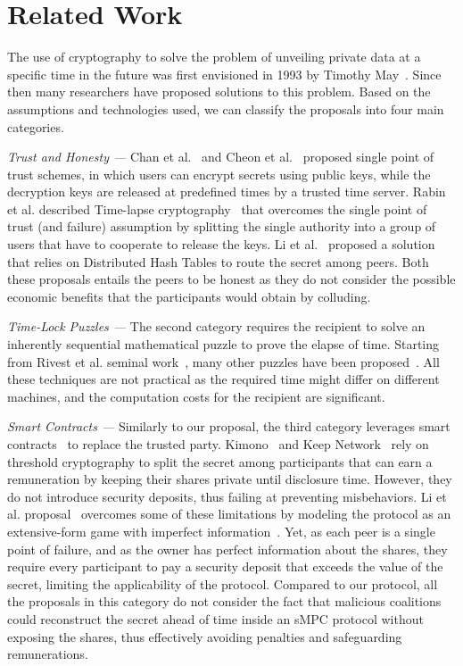\section{Related Work}\label{sect:relwork}

The use of cryptography to solve the problem of unveiling private data at a specific time in the future was first envisioned in 1993 by Timothy May~\cite{may1993timed}. Since then many researchers have proposed solutions to this problem.
%
Based on the assumptions and technologies used, we can classify the proposals into four main categories.

\smallskip
{\em Trust and Honesty ---} Chan et al.~\cite{1437112} and Cheon et al.~\cite{10.1007/11889663_17} proposed single point of trust schemes, in which users can encrypt secrets using public keys, while the decryption keys are released at predefined times by a trusted time server.
%
Rabin et al. described Time-lapse cryptography~\cite{rabin2006time,PARKES2008294} that overcomes the single point of trust (and failure) assumption by splitting the single authority into a group of users that have to cooperate to release the keys. Li et al.~\cite{dht} proposed a solution that relies on Distributed Hash Tables to route the secret among peers. Both these proposals entails the peers to be honest as they do not consider the possible economic benefits that the participants would obtain by colluding.

\smallskip
{\em Time-Lock Puzzles ---} The second category requires the recipient to solve an inherently sequential mathematical puzzle to prove the elapse of time. Starting from Rivest et al. seminal work~\cite{Rivest:1996:TPT:888615}, many other puzzles have been proposed~\cite{Bitansky:2016:TPR:2840728.2840745,cohen2018,mahmoody-tl}. All these techniques are not practical as the required time might differ on different machines, and the computation costs for the recipient are significant.

\smallskip
{\em Smart Contracts ---} Similarly to our proposal, the third category leverages smart contracts~\cite{szabo1997formalizing} to replace the trusted party. Kimono~\cite{kimono,kimono-network} and Keep Network~\cite{keep} rely on threshold cryptography to split the secret among participants that can earn a remuneration by keeping their shares private until disclosure time. However, they do not introduce security deposits, thus failing at preventing misbehaviors.
%
Li et al. proposal~\cite{self-emerging1} overcomes some of these limitations by modeling the protocol as an extensive-form game with imperfect information~\cite{leyton2008essentials}. Yet, as each peer is a single point of failure, and as the owner has perfect information about the shares, they require every participant to pay a security deposit that exceeds the value of the secret, limiting the applicability of the protocol.
%
Compared to our protocol, all the proposals in this category do not consider the fact that malicious coalitions could reconstruct the secret ahead of time inside an sMPC protocol without exposing the shares, thus effectively avoiding penalties and safeguarding remunerations.

